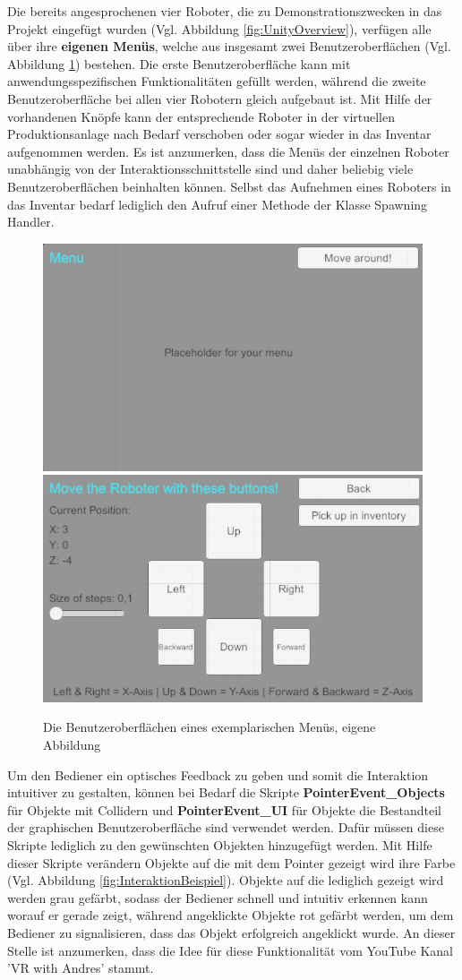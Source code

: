 Die bereits angesprochenen vier Roboter, die zu Demonstrationszwecken in das Projekt eingefügt wurden (Vgl. Abbildung \ref{fig:UnityOverview}), verfügen alle über ihre \textbf{eigenen Menüs}, welche aus insgesamt zwei Benutzeroberflächen (Vgl. Abbildung \ref{fig:BspMenu}) bestehen. Die erste Benutzeroberfläche kann mit anwendungsspezifischen Funktionalitäten gefüllt werden, während die zweite Benutzeroberfläche bei allen vier Robotern gleich aufgebaut ist. Mit Hilfe der vorhandenen Knöpfe kann der entsprechende Roboter in der virtuellen Produktionsanlage nach Bedarf verschoben oder sogar wieder in das Inventar aufgenommen werden. Es ist anzumerken, dass die Menüs der einzelnen Roboter unabhängig von der Interaktionsschnittstelle sind und daher beliebig viele Benutzeroberflächen beinhalten können. Selbst das Aufnehmen eines Roboters in das Inventar bedarf lediglich den Aufruf einer Methode der Klasse Spawning Handler.
\begin{figure}[h]
	\centering
	\includegraphics[width=0.45\linewidth]{Bilder/A52_OM1}
	\includegraphics[width=0.45\linewidth]{Bilder/A53_OM2}
	\caption{Die Benutzeroberflächen eines exemplarischen Menüs, eigene Abbildung}
	\label{fig:BspMenu}
\end{figure}
\newline
Um den Bediener ein optisches Feedback zu geben und somit die Interaktion intuitiver zu gestalten, können bei Bedarf die Skripte \textbf{PointerEvent\_Objects} für Objekte mit Collidern und \textbf{PointerEvent\_UI} für Objekte die Bestandteil der graphischen Benutzeroberfläche sind verwendet werden. Dafür müssen diese Skripte lediglich zu den gewünschten Objekten hinzugefügt werden. Mit Hilfe dieser Skripte verändern Objekte auf die mit dem Pointer gezeigt wird ihre Farbe (Vgl. Abbildung \ref{fig:InteraktionBeispiel}). Objekte auf die lediglich gezeigt wird werden grau gefärbt, sodass der Bediener schnell und intuitiv erkennen kann worauf er gerade zeigt, während angeklickte Objekte rot gefärbt werden, um dem Bediener zu signalisieren, dass das Objekt erfolgreich angeklickt wurde. An dieser Stelle ist anzumerken, dass die Idee für diese Funktionalität vom YouTube Kanal 'VR with Andres' \cite{32} stammt.

